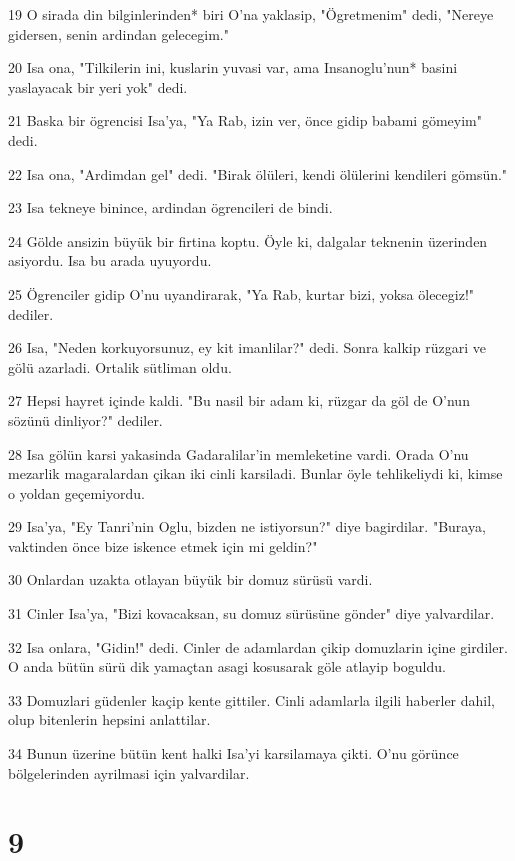 \par 19 O sirada din bilginlerinden* biri O'na yaklasip, "Ögretmenim" dedi, "Nereye gidersen, senin ardindan gelecegim."
\par 20 Isa ona, "Tilkilerin ini, kuslarin yuvasi var, ama Insanoglu'nun* basini yaslayacak bir yeri yok" dedi.
\par 21 Baska bir ögrencisi Isa'ya, "Ya Rab, izin ver, önce gidip babami gömeyim" dedi.
\par 22 Isa ona, "Ardimdan gel" dedi. "Birak ölüleri, kendi ölülerini kendileri gömsün."
\par 23 Isa tekneye binince, ardindan ögrencileri de bindi.
\par 24 Gölde ansizin büyük bir firtina koptu. Öyle ki, dalgalar teknenin üzerinden asiyordu. Isa bu arada uyuyordu.
\par 25 Ögrenciler gidip O'nu uyandirarak, "Ya Rab, kurtar bizi, yoksa ölecegiz!" dediler.
\par 26 Isa, "Neden korkuyorsunuz, ey kit imanlilar?" dedi. Sonra kalkip rüzgari ve gölü azarladi. Ortalik sütliman oldu.
\par 27 Hepsi hayret içinde kaldi. "Bu nasil bir adam ki, rüzgar da göl de O'nun sözünü dinliyor?" dediler.
\par 28 Isa gölün karsi yakasinda Gadaralilar'in memleketine vardi. Orada O'nu mezarlik magaralardan çikan iki cinli karsiladi. Bunlar öyle tehlikeliydi ki, kimse o yoldan geçemiyordu.
\par 29 Isa'ya, "Ey Tanri'nin Oglu, bizden ne istiyorsun?" diye bagirdilar. "Buraya, vaktinden önce bize iskence etmek için mi geldin?"
\par 30 Onlardan uzakta otlayan büyük bir domuz sürüsü vardi.
\par 31 Cinler Isa'ya, "Bizi kovacaksan, su domuz sürüsüne gönder" diye yalvardilar.
\par 32 Isa onlara, "Gidin!" dedi. Cinler de adamlardan çikip domuzlarin içine girdiler. O anda bütün sürü dik yamaçtan asagi kosusarak göle atlayip boguldu.
\par 33 Domuzlari güdenler kaçip kente gittiler. Cinli adamlarla ilgili haberler dahil, olup bitenlerin hepsini anlattilar.
\par 34 Bunun üzerine bütün kent halki Isa'yi karsilamaya çikti. O'nu görünce bölgelerinden ayrilmasi için yalvardilar.

\chapter{9}


